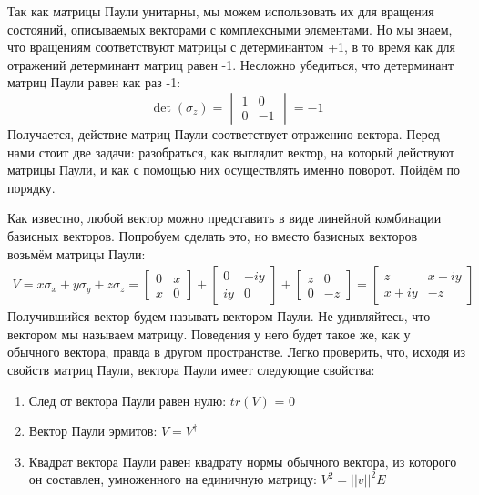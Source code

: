 Так как матрицы Паули унитарны, мы можем использовать их для вращения состояний, описываемых векторами с комплексными элементами. Но мы знаем, что вращениям соответствуют матрицы с детерминантом +1, в то время как для отражений детерминант матриц равен -1. Несложно убедиться, что детерминант матриц Паули равен как раз -1:
\[
\det(\sigma_z) = \begin{vmatrix} 1 & 0 \\ 0 & -1 \end{vmatrix} = -1 
\]
Получается, действие матриц Паули соответствует отражению вектора. Перед нами стоит две задачи: разобраться, как выглядит вектор, на который действуют матрицы Паули, и как с помощью них осуществлять именно поворот. Пойдём по порядку.

Как известно, любой вектор можно представить в виде линейной комбинации базисных векторов. Попробуем сделать это, но вместо базисных векторов возьмём матрицы Паули:
\begin{align*}
V = x\sigma_x + y\sigma_y + z\sigma_z = \begin{bmatrix} 0 & x \\ x & 0 \end{bmatrix} + \begin{bmatrix} 0 & -iy \\ iy & 0 \end{bmatrix} + \begin{bmatrix} z & 0 \\ 0 & -z \end{bmatrix} = \begin{bmatrix} z & x-iy \\ x+iy & -z \end{bmatrix}
\end{align*}
Получившийся вектор будем называть вектором Паули. Не удивляйтесь, что вектором мы называем матрицу. Поведения у него будет такое же, как у обычного вектора, правда в другом пространстве. Легко проверить, что, исходя из свойств матриц Паули, вектора Паули имеет следующие свойства:
\begin{enumerate}
    \item След от вектора Паули равен нулю: $tr(V)$ = 0
    \item Вектор Паули эрмитов: $V = V^{\dagger}$
    \item Квадрат вектора Паули равен квадрату нормы обычного вектора, из которого он составлен, умноженного на единичную матрицу: $V^2 = ||v||^2E$ 
\end{enumerate}

